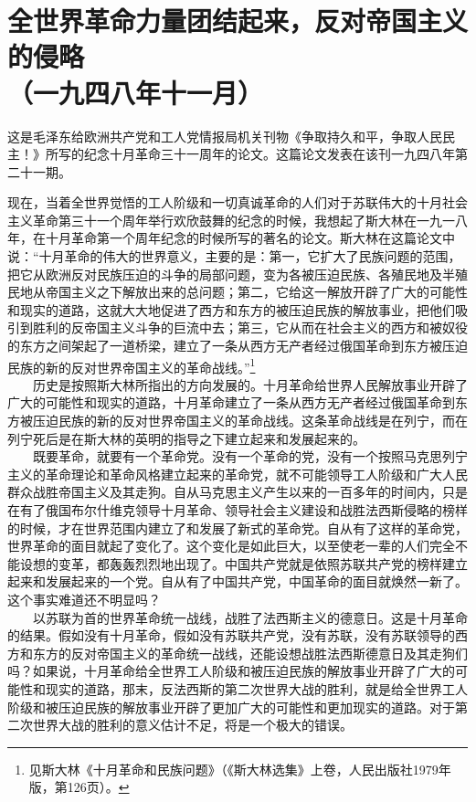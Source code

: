 \documentclass[cn,11pt,chinese]{elegantbook}
\def\myformat#1{\hfil\hfil #1}
\begin{document}
\newpage\section*{\myformat{全世界革命力量团结起来，反对帝国主义的侵略}\\\myformat{（一九四八年十一月）}}
\begin{introduction}\item  这是毛泽东给欧洲共产党和工人党情报局机关刊物《争取持久和平，争取人民民主！》所写的纪念十月革命三十一周年的论文。这篇论文发表在该刊一九四八年第二十一期。\end{introduction}
现在，当着全世界觉悟的工人阶级和一切真诚革命的人们对于苏联伟大的十月社会主义革命第三十一个周年举行欢欣鼓舞的纪念的时候，我想起了斯大林在一九一八年，在十月革命第一个周年纪念的时候所写的著名的论文。斯大林在这篇论文中说：“十月革命的伟大的世界意义，主要的是：第一，它扩大了民族问题的范围，把它从欧洲反对民族压迫的斗争的局部问题，变为各被压迫民族、各殖民地及半殖民地从帝国主义之下解放出来的总问题；第二，它给这一解放开辟了广大的可能性和现实的道路，这就大大地促进了西方和东方的被压迫民族的解放事业，把他们吸引到胜利的反帝国主义斗争的巨流中去；第三，它从而在社会主义的西方和被奴役的东方之间架起了一道桥梁，建立了一条从西方无产者经过俄国革命到东方被压迫民族的新的反对世界帝国主义的革命战线。”\footnote[1]{ 见斯大林《十月革命和民族问题》（《斯大林选集》上卷，人民出版社1979年版，第126页）。}\\
　　历史是按照斯大林所指出的方向发展的。十月革命给世界人民解放事业开辟了广大的可能性和现实的道路，十月革命建立了一条从西方无产者经过俄国革命到东方被压迫民族的新的反对世界帝国主义的革命战线。这条革命战线是在列宁，而在列宁死后是在斯大林的英明的指导之下建立起来和发展起来的。\\
　　既要革命，就要有一个革命党。没有一个革命的党，没有一个按照马克思列宁主义的革命理论和革命风格建立起来的革命党，就不可能领导工人阶级和广大人民群众战胜帝国主义及其走狗。自从马克思主义产生以来的一百多年的时间内，只是在有了俄国布尔什维克领导十月革命、领导社会主义建设和战胜法西斯侵略的榜样的时候，才在世界范围内建立了和发展了新式的革命党。自从有了这样的革命党，世界革命的面目就起了变化了。这个变化是如此巨大，以至使老一辈的人们完全不能设想的变革，都轰轰烈烈地出现了。中国共产党就是依照苏联共产党的榜样建立起来和发展起来的一个党。自从有了中国共产党，中国革命的面目就焕然一新了。这个事实难道还不明显吗？\\
　　以苏联为首的世界革命统一战线，战胜了法西斯主义的德意日。这是十月革命的结果。假如没有十月革命，假如没有苏联共产党，没有苏联，没有苏联领导的西方和东方的反对帝国主义的革命统一战线，还能设想战胜法西斯德意日及其走狗们吗？如果说，十月革命给全世界工人阶级和被压迫民族的解放事业开辟了广大的可能性和现实的道路，那末，反法西斯的第二次世界大战的胜利，就是给全世界工人阶级和被压迫民族的解放事业开辟了更加广大的可能性和更加现实的道路。对于第二次世界大战的胜利的意义估计不足，将是一个极大的错误。\\
\end{document}
